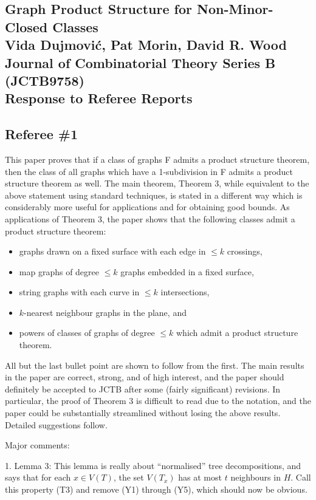 \documentclass[12pt]{article}
\begin{document}
\subsection*{Graph Product Structure for Non-Minor-Closed Classes\\
Vida Dujmovi\'c, Pat Morin, David R. Wood\\
Journal of Combinatorial Theory Series B (JCTB9758)\\
Response to Referee Reports}
		
\subsection*{Referee \#1}

This paper proves that if a class of graphs F admits a product structure
theorem, then the class of all graphs which have a 1-subdivision in F admits
a product structure theorem as well. The main theorem, Theorem 3, while
equivalent to the above statement using standard techniques, is stated in
a different way which is considerably more useful for applications and for
obtaining good bounds. As applications of Theorem 3, the paper shows that
the following classes admit a product structure theorem:

\begin{itemize}
\item graphs drawn on a fixed surface with each edge in $\leq k$ crossings,
\item map graphs of degree $\leq k$ graphs embedded in a fixed surface,
\item string graphs with each curve in $\leq k$ intersections,
\item $k$-nearest neighbour graphs in the plane, and
\item powers of classes of graphs of degree $\leq k$ which admit a product structure theorem.
\end{itemize}

All but the last bullet point are shown to follow from the first.
The main results in the paper are correct, strong, and of high interest,
and the paper should definitely be accepted to JCTB after some
(fairly significant) revisions. In particular, the proof of Theorem 3 is
difficult to read due to the notation, and the paper could be substantially
streamlined without losing the above results. Detailed suggestions follow.

Major comments:

1. Lemma 3: This lemma is really about ``normalised'' tree decompositions, and says that for each $x \in V(T)$, the set $V(T_x)$ has at most $t$ neighbours in $H$. Call this property (T3) and remove (Y1)  through (Y5), which should now be obvious.
\end{document}

